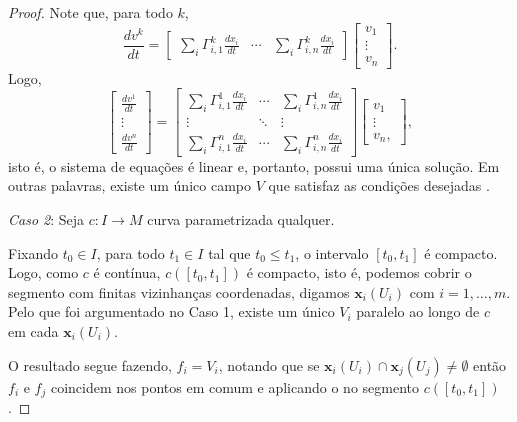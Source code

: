 \begin{proposition}
\begin{proof}
		Note que, para todo $k$,
		\begin{equation*}
			\frac{dv^{k}}{dt}=\begin{bmatrix}
				\sum_{i}\Gamma_{i,1}^{k}\frac{dx_{i}}{dt} & \cdots & \sum_{i}\Gamma_{i,n}^{k}\frac{dx_{i}}{dt}
			\end{bmatrix}\begin{bmatrix}
				v_{1} \\ \vdots \\ v_{n}
			\end{bmatrix}.
		\end{equation*}
		Logo,
		\begin{equation*}
			\begin{bmatrix}
				\frac{dv^{1}}{dt} \\ \vdots \\ \frac{dv^{n}}{dt}
			\end{bmatrix} = \begin{bmatrix}
				\sum_{i}\Gamma_{i,1}^{1}\frac{dx_{i}}{dt} & \cdots & \sum_{i}\Gamma_{i,n}^{1}\frac{dx_{i}}{dt} \\
				\vdots                                    & \ddots & \vdots                                    \\
				\sum_{i}\Gamma_{i,1}^{n}\frac{dx_{i}}{dt} & \cdots & \sum_{i}\Gamma_{i,n}^{n}\frac{dx_{i}}{dt}
			\end{bmatrix} \begin{bmatrix}
				v_{1}  \\
				\vdots \\
				v_{n},
			\end{bmatrix},
		\end{equation*}
		isto é, o sistema de equações é linear e, portanto, possui uma única solução. Em outras palavras, existe um único campo $V$ que satisfaz as condições desejadas \cite{doCarmo1992}.

		\emph{Caso 2}: Seja $c:I\to M$ curva parametrizada qualquer.

		Fixando $t_{0}\in I$, para todo $t_{1} \in I$ tal que $t_{0} \leq t_{1}$, o intervalo $[t_{0}, t_{1}]$ é compacto. Logo, como $c$ é contínua, $c([t_{0},t_{1}])$ é compacto, isto é, podemos cobrir o segmento com finitas vizinhanças coordenadas, digamos $\mathbf{x}_{i}(U_{i})$ com $i=1, \dots, m$.
		Pelo que foi argumentado no Caso 1, existe um único $V_{i}$ paralelo ao longo de $c$ em cada $\mathbf{x}_{i}(U_{i})$.

		O resultado segue fazendo, $f_{i}=V_{i}$, notando que se $\mathbf{x}_{i}(U_{i})\cap \mathbf{x}_{j}(U_{j})\neq \emptyset$ então $f_{i}$ e $f_{j}$ coincidem nos pontos em comum e aplicando o  no segmento $c([t_{0},t_{1}])$.
	\end{proof}
\end{proposition}
